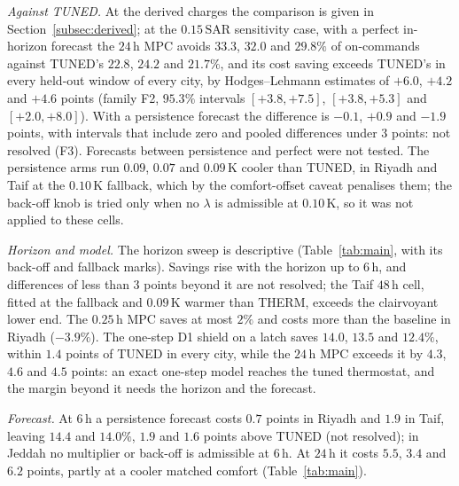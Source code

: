 \documentclass[pdflatex,sn-mathphys-num,iicol]{sn-jnl}
\theoremstyle{thmstyleone}\newtheorem{proposition}{Proposition}\newtheorem{corollary}{Corollary}
\theoremstyle{thmstyletwo}\newtheorem{remark}{Remark}\newtheorem{observation}{Observation}
\theoremstyle{thmstylethree}\newtheorem{definition}{Definition}
\newcommand{\SAR}{\text{SAR}}
\begin{document}


\emph{Against TUNED.} At the derived charges the comparison is given in Section~\ref{subsec:derived}; at the $0.15\,\SAR$ sensitivity case, with a perfect in-horizon forecast the $24\,$h MPC avoids $33.3$, $32.0$ and $29.8\%$ of on-commands against TUNED's $22.8$, $24.2$ and $21.7\%$, and its cost saving exceeds TUNED's in every held-out window of every city, by Hodges--Lehmann estimates of $+6.0$, $+4.2$ and $+4.6$ points (family F2, $95.3\%$ intervals $[+3.8,+7.5]$, $[+3.8,+5.3]$ and $[+2.0,+8.0]$). With a persistence forecast the difference is $-0.1$, $+0.9$ and $-1.9$ points, with intervals that include zero and pooled differences under $3$ points: not resolved (F3). Forecasts between persistence and perfect were not tested. The persistence arms run $0.09$, $0.07$ and $0.09\,$K cooler than TUNED, in Riyadh and Taif at the $0.10\,$K fallback, which by the comfort-offset caveat penalises them; the back-off knob is tried only when no $\lambda$ is admissible at $0.10\,$K, so it was not applied to these cells.

\emph{Horizon and model.} The horizon sweep is descriptive (Table~\ref{tab:main}, with its back-off and fallback marks). Savings rise with the horizon up to $6\,$h, and differences of less than $3$ points beyond it are not resolved; the Taif $48\,$h cell, fitted at the fallback and $0.09\,$K warmer than THERM, exceeds the clairvoyant lower end. The $0.25\,$h MPC saves at most $2\%$ and costs more than the baseline in Riyadh ($-3.9\%$). The one-step D1 shield on a latch saves $14.0$, $13.5$ and $12.4\%$, within $1.4$ points of TUNED in every city, while the $24\,$h MPC exceeds it by $4.3$, $4.6$ and $4.5$ points: an exact one-step model reaches the tuned thermostat, and the margin beyond it needs the horizon and the forecast.

\emph{Forecast.} At $6\,$h a persistence forecast costs $0.7$ points in Riyadh and $1.9$ in Taif, leaving $14.4$ and $14.0\%$, $1.9$ and $1.6$ points above TUNED (not resolved); in Jeddah no multiplier or back-off is admissible at $6\,$h. At $24\,$h it costs $5.5$, $3.4$ and $6.2$ points, partly at a cooler matched comfort (Table~\ref{tab:main}).
\end{document}

